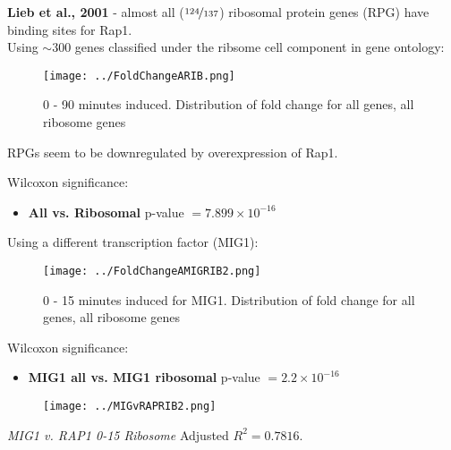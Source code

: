 \documentclass{beamer}
\begin{document}
\begin{frame}
    \textbf{Lieb et al., 2001} - almost all ($\nicefrac{124}{137}$) ribosomal protein genes (RPG) have binding sites for Rap1.\\

{ \scriptsize Using $\sim 300$ genes classified under the ribsome cell component in gene ontology:}
    \begin{figure}[ht!]
            \centering
            \texttt{[image: ../FoldChangeARIB.png]}
            \caption{0 - 90 minutes induced. Distribution of fold change for {\color{gray} all genes}, {\color{blue} all ribosome genes}}
            \label{fig:all.rib}
        \end{figure}

        RPGs seem to be downregulated by overexpression of Rap1.

 Wilcoxon significance:
    \begin{itemize}
        \item \textbf{All vs. Ribosomal} p-value $=7.899 \times 10^{-16}$
    \end{itemize}
\end{frame}

\begin{frame}

    \bigskip
    { \scriptsize Using a different transcription factor (MIG1):}
    \begin{figure}[ht!]
            \centering
            \texttt{[image: ../FoldChangeAMIGRIB2.png]}
            \caption{0 - 15 minutes induced for MIG1. Distribution of fold change for {\color{gray} all genes}, {\color{blue} all ribosome genes}}
            \label{fig:all.rib}
        \end{figure}

 Wilcoxon significance:
    \begin{itemize}
        \item \textbf{MIG1 all vs. MIG1 ribosomal} p-value $= 2.2 \times 10^{-16}$
    \end{itemize}
\end{frame}

\begin{frame}
    
    \begin{figure}[ht!]
        \centering
        \texttt{[image: ../MIGvRAPRIB2.png]}
        \label{fig:mig.rap.rib}
    \end{figure}\footnotesize

    {\footnotesize \emph{MIG1 v. RAP1 0-15 Ribosome} \hfill Adjusted $R^2 = 0.7816$.}
\end{frame}
\end{document}
